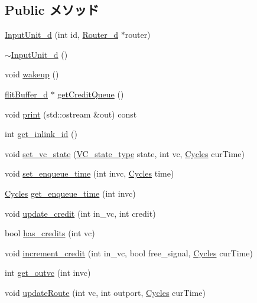 \subsection*{Public メソッド}
\begin{DoxyCompactItemize}
\item 
\hyperlink{classInputUnit__d_abf9f22df6ddb9792b07be6650ed39e1b}{InputUnit\_\-d} (int id, \hyperlink{classRouter__d}{Router\_\-d} $\ast$router)
\item 
\hyperlink{classInputUnit__d_a4614c64584d1e7dae55da95452b0ea2a}{$\sim$InputUnit\_\-d} ()
\item 
void \hyperlink{classInputUnit__d_ae674290a26ecbd622c5160e38e8a4fe9}{wakeup} ()
\item 
\hyperlink{classflitBuffer__d}{flitBuffer\_\-d} $\ast$ \hyperlink{classInputUnit__d_ae77ac4bed244a5b246b4de1053e35949}{getCreditQueue} ()
\item 
void \hyperlink{classInputUnit__d_ac55fe386a101fbae38c716067c9966a0}{print} (std::ostream \&out) const 
\item 
int \hyperlink{classInputUnit__d_a9fd25c2e12a027c97fcc54d09ee2971f}{get\_\-inlink\_\-id} ()
\item 
void \hyperlink{classInputUnit__d_a67dafbe49b665179990b2bdadfc133c9}{set\_\-vc\_\-state} (\hyperlink{NetworkHeader_8hh_aaafaa208359111dcd9f4d47ff377da76}{VC\_\-state\_\-type} state, int vc, \hyperlink{classCycles}{Cycles} curTime)
\item 
void \hyperlink{classInputUnit__d_aeafc60409d8d5d509f37f72601c5c2e1}{set\_\-enqueue\_\-time} (int invc, \hyperlink{classCycles}{Cycles} time)
\item 
\hyperlink{classCycles}{Cycles} \hyperlink{classInputUnit__d_a7798871f894ba591ca7f4aa75ee14791}{get\_\-enqueue\_\-time} (int invc)
\item 
void \hyperlink{classInputUnit__d_aee6ae59a64822a6f5b32ee88a8e26217}{update\_\-credit} (int in\_\-vc, int credit)
\item 
bool \hyperlink{classInputUnit__d_ae60433780eab2faa984318e2507b9a4a}{has\_\-credits} (int vc)
\item 
void \hyperlink{classInputUnit__d_aa389f8069c58070a89061dc51d8871f2}{increment\_\-credit} (int in\_\-vc, bool free\_\-signal, \hyperlink{classCycles}{Cycles} curTime)
\item 
int \hyperlink{classInputUnit__d_a3b298665e4de7737f33ebef9d87a0762}{get\_\-outvc} (int invc)
\item 
void \hyperlink{classInputUnit__d_ab2f58089dd6bd314ce6dae4298a6f190}{updateRoute} (int vc, int outport, \hyperlink{classCycles}{Cycles} curTime)

\end{DoxyCompactItemize}
